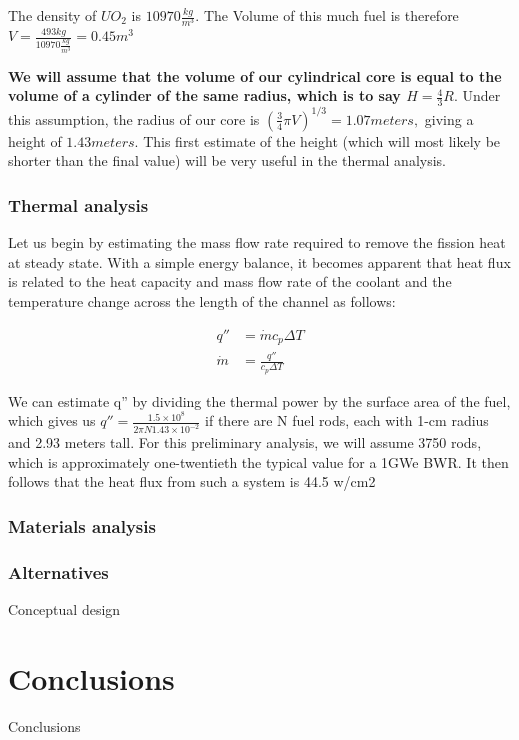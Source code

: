 \documentclass[12pt]{article}
\begin{document}
The density of $UO_2$ is $10970 \frac{kg}{m^3}$. The Volume of this much fuel is therefore $V = \frac{493 kg}{10970 \frac{kg}{m^3}} =  0.45 m ^ 3 $

\textbf{We will assume that the volume of our cylindrical core is equal to the volume of a cylinder of the same radius, which is to say $H = \frac{4}{3} R$}. Under this assumption, the radius of our core is $(\frac{3}{4} \pi V) ^ {1/3} = 1.07 meters,$ giving a height of $1.43 meters$. This first estimate of the height (which will most likely be shorter than the final value) will be very useful in the thermal analysis.   
\subsubsection{Thermal analysis}
Let us begin by estimating the mass flow rate required to remove the fission heat at steady state. With a simple energy balance, it becomes apparent that heat flux is related to the heat capacity and mass flow rate of the coolant and the temperature change across the length of the channel as follows:

\begin{align}
q'' &= \dot{m} c_p \Delta T \\
\dot{m} &= \frac{q''}{c_p \Delta T}
\end{align}

We can estimate q'' by dividing the thermal power by the surface area of the fuel, which gives us $q'' = \frac{1.5 \times 10^8}{2 \pi N 1.43 \times 10 ^{-2}}$ if there are N fuel rods, each with 1-cm radius and 2.93 meters tall. For this preliminary analysis, we will assume 3750 rods, which is approximately one-twentieth the typical value for a 1GWe BWR. It then follows that the heat flux from such a system is 44.5 w/cm2

\subsubsection{Materials analysis}
\subsubsection{Alternatives}
Conceptual design
\section{Conclusions}
Conclusions

\end{document}

